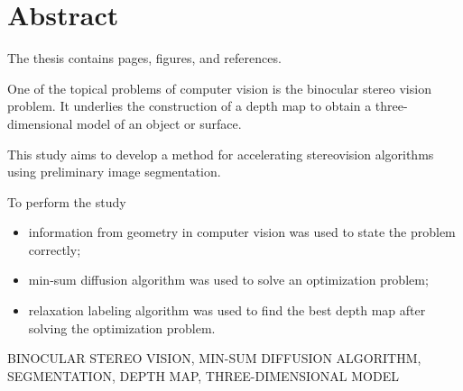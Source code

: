 \chapter*{Abstract}

The thesis contains \pageref{LastPage} pages,
 figures, and
 references.

One of the topical problems
of computer vision is the binocular stereo vision problem.
It underlies the construction of a depth map to obtain a three-dimensional model
of an object or surface.

This study aims to develop a method
for accelerating stereovision algorithms using preliminary image segmentation.

To perform the study
\begin{itemize}
  \item information from geometry
        in computer vision was used to state the problem correctly;
  \item min-sum diffusion algorithm was used to solve an optimization problem;
  \item relaxation labeling algorithm was used to find the best depth map after
        solving the optimization problem.
\end{itemize}

\MakeUppercase{binocular stereo vision,
               min-sum diffusion algorithm,
               segmentation,
               depth map,
               three-dimensional model}

